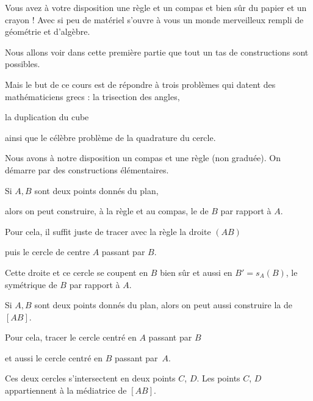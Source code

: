 







\debuttexte


\diapo

\change
Vous avez à votre disposition une règle et un compas et bien sûr du papier 
et un crayon ! Avec si peu de matériel s'ouvre à vous un monde merveilleux 
rempli de géométrie et d'algèbre.

\change
Nous allons voir dans cette première partie que tout 
un tas de constructions sont possibles.

\change
Mais le but de ce cours est de répondre à trois problèmes 
qui datent des mathématiciens grecs :
la trisection des angles, 

\change
la duplication du cube 

\change
ainsi que le célèbre problème de la quadrature du cercle.

\diapo

Nous avons à notre disposition un compas et une règle (non graduée).
On démarre par des constructions élémentaires. 

\change
Si $A,B$ sont deux points donnés du plan, 

\change 
alors on peut construire, à la règle et au compas, 
  le  de $B$ par rapport à $A$.
  
\change  
  Pour cela, il suffit juste de tracer avec la règle la droite $(AB)$ 
  
\change  
  puis le cercle de centre $A$ passant par $B$.
  
\change
  Cette droite et ce cercle se coupent en $B$ bien sûr et aussi en $B' =s_A(B)$,
  le symétrique de $B$ par rapport à $A$.
  
\change
Si $A,B$ sont deux points donnés du plan, alors on peut aussi construire la 
   de $[AB]$.
  
\change
  Pour cela, tracer le cercle centré en $A$ passant par $B$ 
  
\change
  et aussi le cercle centré en $B$ passant par~$A$. 
  
\change   
  Ces deux cercles s'intersectent en deux points $C$, $D$. 
  Les points $C$, $D$ appartiennent à la médiatrice de $[AB]$.
  
